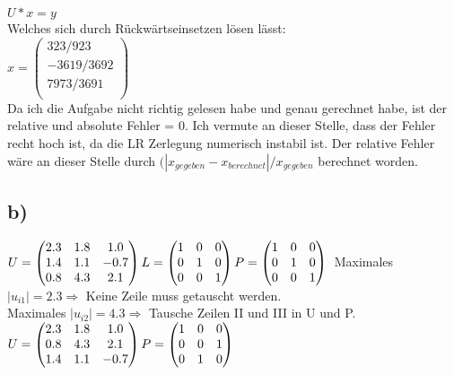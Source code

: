 \documentclass[10pt,a4paper]{article}
\begin{document}
$U * x = y$\\
Welches sich durch Rückwärtseinsetzen lösen lässt:\\
$ x = \begin{pmatrix}
    323/923\\
    -3619/3692\\
    7973/3691\\
\end{pmatrix}$ \\
Da ich die Aufgabe nicht richtig gelesen habe und genau gerechnet habe, ist der relative und absolute Fehler = 0. Ich vermute an dieser Stelle, dass der Fehler recht hoch ist, da die LR Zerlegung numerisch instabil ist. Der relative Fehler wäre an dieser Stelle durch $(|x_{gegeben}-x_{berechnet}|/x_{gegeben}$ berechnet worden. 
\subsection*{b)}
$ U = \begin{pmatrix}
    2.3 & 1.8 & 1.0\\
    1.4 & 1.1 & -0.7\\
    0.8 & 4.3 & 2.1\\
\end{pmatrix}
L = \begin{pmatrix}
    1 & 0 & 0\\
    0 & 1 & 0\\
    0 & 0 & 1\\
\end{pmatrix}\\
P = \begin{pmatrix}
    1 & 0 & 0\\
    0 & 1 & 0\\
    0 & 0 & 1\\
\end{pmatrix}\\$
Maximales $ |u_{i1}| = 2.3 \Rightarrow $ Keine Zeile muss getauscht werden.\\
Maximales $|u_{i2}| = 4.3 \Rightarrow $ Tausche Zeilen II und III in U und P.\\
$ U = \begin{pmatrix}
    2.3 & 1.8 & 1.0\\
    0.8 & 4.3 & 2.1\\
    1.4 & 1.1 & -0.7\\
\end{pmatrix}\\
P = \begin{pmatrix}
    1 & 0 & 0\\
    0 & 0 & 1\\
    0 & 1 & 0\\
\end{pmatrix}\\$
\end{document}
